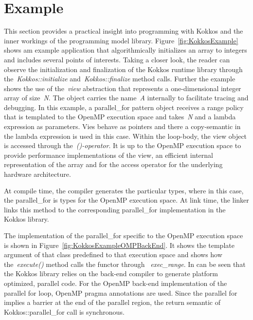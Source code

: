 \section{Example}\label{chap:kokkosExample}

This section provides a practical insight into programming with Kokkos and the inner workings of the programming model library. Figure~\ref{fig:KokkosExample} shows am example application that algorithmically initializes an array to integers and includes several points of interests. Taking a closer look, the reader can observe the initialization and finalization of the Kokkos runtime library through the~\emph{Kokkos::initialize} and~\emph{Kokkos::finalize} method calls. Further the example shows the use of the~\emph{view} abstraction that represents a one-dimensional integer array of size~\emph{N}. The object carries the name~\emph{A} internally to facilitate tracing and debugging. In this example, a parallel\_for pattern object receives a range policy that is templated to the OpenMP execution space and takes~\emph{N} and a lambda expression as parameters. Vies behave as pointers and there a copy-semantic in the lambda expression is used in this case. Within the loop-body, the view object is accessed through the~\emph{()-operator}. It is up to the OpenMP execution space to provide performance implementations of the view, an efficient internal representation of the array and for the access operator for the underlying hardware architecture.

At compile time, the compiler generates the particular types, where in this case, the parallel\_for is types for the OpenMP execution space. At link time, the linker links this method to the corresponding parallel\_for implementation in the Kokkos library.

The implementation of the parallel\_for specific to the OpenMP execution space is shown in Figure~\ref{fig:KokkosExampleOMPBackEnd}. It shows the template argument of that class predefined to that execution space and shows how the~\emph{execute()} method calls the functor through ~\emph{exec\_range}. In can be seen that the Kokkos library relies on the back-end compiler to generate platform optimized, parallel code. For the OpenMP back-end implementation of the parallel for loop, OpenMP pragma annotations are used. Since the parallel for implies a barrier at the end of the parallel region, the return semantic of Kokkos::parallel\_for call is synchronous. 

